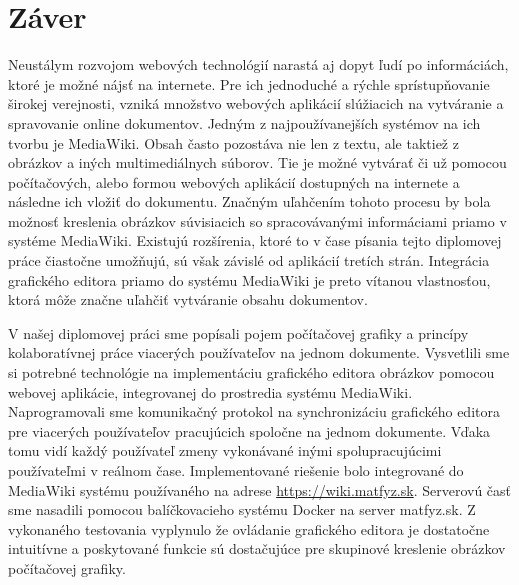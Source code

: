 \chapter{Záver}\label{chap:conclusion}
Neustálym rozvojom webových technológií narastá aj dopyt ľudí po informáciách, ktoré je možné nájsť na internete. Pre ich jednoduché a rýchle sprístupňovanie širokej verejnosti, vzniká množstvo webových aplikácií slúžiacich na vytváranie a spravovanie online dokumentov. Jedným z najpoužívanejších systémov na ich tvorbu je MediaWiki. Obsah často pozostáva nie len z textu, ale taktiež z obrázkov a iných multimediálnych súborov. Tie je možné vytvárať či už pomocou počítačových, alebo formou webových aplikácií dostupných na internete a následne ich vložiť do dokumentu. Značným uľahčením tohoto procesu by bola možnosť kreslenia obrázkov súvisiacich so spracovávanými informáciami priamo v systéme MediaWiki. Existujú rozšírenia, ktoré to v čase písania tejto diplomovej práce čiastočne umožňujú, sú však závislé od aplikácií tretích strán. Integrácia grafického editora priamo do systému MediaWiki je preto vítanou vlastnosťou, ktorá môže značne uľahčiť vytváranie obsahu dokumentov.

V našej diplomovej práci sme popísali pojem počítačovej grafiky a princípy kolaboratívnej práce viacerých používateľov na jednom dokumente. Vysvetlili sme si potrebné technológie na implementáciu grafického editora obrázkov pomocou webovej aplikácie, integrovanej do prostredia systému MediaWiki. Naprogramovali sme komunikačný protokol na synchronizáciu grafického editora pre viacerých používateľov pracujúcich spoločne na jednom dokumente. Vďaka tomu vidí každý používateľ zmeny vykonávané inými spolupracujúcimi používateľmi v reálnom čase. Implementované riešenie bolo integrované do MediaWiki systému používaného na adrese \url{https://wiki.matfyz.sk}. Serverovú časť sme nasadili pomocou balíčkovacieho systému Docker na server matfyz.sk. Z vykonaného testovania vyplynulo že ovládanie grafického editora je dostatočne intuitívne a poskytované funkcie sú dostačujúce pre skupinové kreslenie obrázkov počítačovej grafiky.